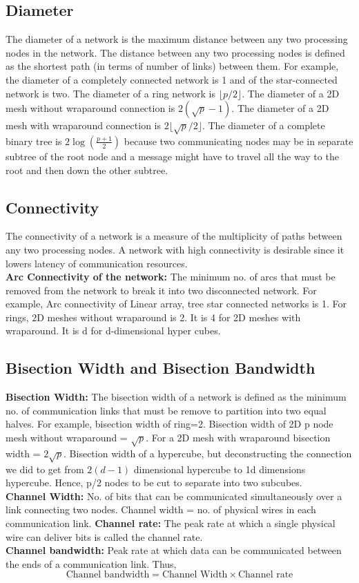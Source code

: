 \documentclass[12pt]{book}
\begin{document}
\subsection{Diameter} 
The diameter of a network is the maximum distance between any two processing nodes in the network. The distance between 
any two processing nodes is defined as the shortest path (in terms of number of links) between them. 
For example, the diameter of a completely connected network is 1 and of the star-connected network is two. The diameter of 
a ring network is $\lfloor p/2 \rfloor$. The diameter of a 2D mesh without wraparound connection is $2(\sqrt{p}-1)$.
The diameter of a 2D mesh with wraparound connection is $2\lfloor\sqrt{p}/2\rfloor$.
The diameter of a complete binary tree is $2\log(\frac{p+1}{2})$ because two communicating nodes may be in separate subtree of the root node and a message might have to travel
all the way to the root and then down the other subtree.

\subsection{Connectivity}
The connectivity of a network is a measure of the multiplicity of paths between any two processing nodes. A network with high connectivity is desirable since it lowers latency of communication resources.\\
\textbf{Arc Connectivity of the network: }The minimum no. of arcs that must be removed from the network to break it into two disconnected network. 
For example, Arc connectivity of Linear array, tree star connected networks is 1. 
For rings, 2D meshes without wraparound is 2. It is 4 for 2D meshes with wraparound. It is d for d-dimensional hyper cubes.

\subsection{Bisection Width and Bisection Bandwidth}
\textbf{Bisection Width: }The bisection width of a network is defined as the minimum no. of communication links that must be remove to partition into
two equal halves. For example, bisection width of ring=2. Bisection width of 2D p node mesh without wraparound = $\sqrt{p}$. For a 2D mesh with wraparound bisection 
width = $2\sqrt{p}$. Bisection width of a hypercube, but deconstructing the connection we did to get from $2(d-1)$ dimensional hypercube to 1d dimensions hypercube. Hence, 
p/2 nodes to be cut to separate into two subcubes.\\
\textbf{Channel Width: } No. of bits that can be communicated simultaneously over a link connecting two nodes. Channel width = no. of physical wires in each communication link.
\textbf{Channel rate: }The peak rate at which a single physical wire can deliver bits is called the channel rate.\\
\textbf{Channel bandwidth: }Peak rate at which data can be communicated between the ends of a communication link.
Thus, 
\begin{equation}
    \text{Channel bandwidth} = \text{Channel Width} \times \text{Channel rate}
\end{equation}
\end{document}

